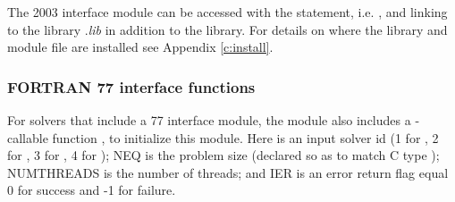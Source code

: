 The {\F} 2003 {\nvecopenmp} interface module can be accessed with the 
statement, i.e. , and linking to the library
.{\em lib} in addition to the {\CC} library.
For details on where the library and module file
 are installed see Appendix \ref{c:install}.

\subsubsection*{FORTRAN 77 interface functions}
For solvers that include a {\F} 77 interface module, the {\nvecopenmp}
module also includes a {\F}-callable function
, to initialize this
module.  Here  is an input solver id
(1 for {\cvode}, 2 for {\ida}, 3 for {\kinsol}, 4 for {\arkode}); NEQ is
the problem size (declared so as to match C type );
NUMTHREADS is the number of threads; and IER is an error return flag
equal 0 for success and -1 for failure.
